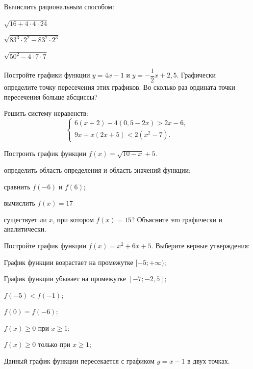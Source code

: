 \newpage
%
%
\begin{homework}[number=1]
	\begin{listofex}
		\item Вычислить рациональным способом:
		\begin{enumcols}[itemcolumns=3]
			\item \( \sqrt{16+4\cdot4\cdot24} \)
			\item \( \sqrt{83^3\cdot2^2-83^2\cdot2^3} \)
			\item \( \sqrt{50^2-4\cdot7\cdot7} \)
		\end{enumcols}
		\item Постройте графики функции \( y=4x-1 \) и \( y=-\dfrac{1}{2}x+2,5 \). Графически определите точку пересечения этих графиков. Во сколько раз ордината точки пересечения больше абсциссы?
		\item Решить систему неравенств:
		\[ \left\{
		\begin{array}{l}
			6(x+2)-4(0,5-2x)>2x-6,\\
			9x+x(2x+5)<2(x^2-7).
		\end{array}
		\right. \]
		\item {}
		\item {}
		\item Построить график функции \( f(x)=\sqrt{10-x}+5 \).
		\begin{enumcols}[itemcolumns=1]
			\item определить область определения и область значений функции;
			\item сравнить \( f(-6) \) и \( f(6) \);
			\item вычислить \( f(x)=17 \)
			\item существует ли \( x \), при котором \( f(x)=15 \)? Объясните это графически и аналитически.
		\end{enumcols}
		\item Постройте график функции \( f(x)=x^2+6x+5 \). Выберите верные утверждения:
		\begin{enumcols}[itemcolumns=1]
			\item График функции возрастает на промежутке \( [-5;+\infty) \);
			\item График функции убывает на промежутке \( [-7;-2,5] \);
			\item \( f(-5)<f(-1) \);
			\item \( f(0)=f(-6) \);
			\item \( f(x)\ge0 \) при \( x\ge1 \);
			\item \( f(x)\ge0 \) только при \( x\ge1 \);
			\item Данный график функции пересекается с графиком \( y=x-1 \) в двух точках.
		\end{enumcols}
	\end{listofex}
\end{homework}
